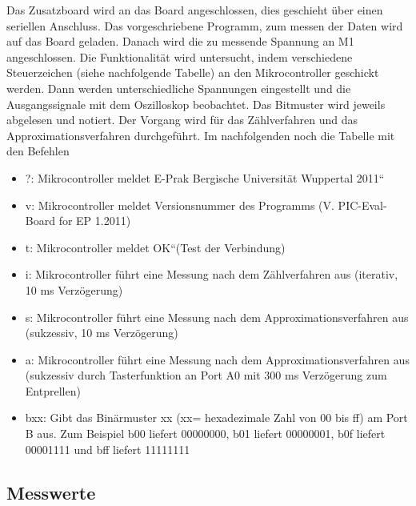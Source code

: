 \documentclass[12pt,a4paper]{article}
\begin{document}
Das Zusatzboard wird an das Board angeschlossen, dies geschieht über einen seriellen Anschluss. Das vorgeschriebene Programm, zum messen der Daten wird auf das Board geladen. Danach wird die zu messende Spannung an M1 angeschlossen. Die Funktionalität wird untersucht, indem verschiedene Steuerzeichen (siehe nachfolgende Tabelle) an den Mikrocontroller geschickt werden. Dann werden unterschiedliche Spannungen eingestellt und die Ausgangssignale mit dem Oszilloskop beobachtet. Das Bitmuster wird jeweils abgelesen und notiert. Der Vorgang wird für das Zählverfahren und das Approximationsverfahren durchgeführt. Im nachfolgenden noch die Tabelle mit den Befehlen

\begin{itemize}
\item	?: Mikrocontroller meldet E-Prak Bergische Universität Wuppertal 2011“

\item	v: Mikrocontroller meldet Versionsnummer des Programms (V. PIC-Eval-Board for EP 1.2011)

\item	t: Mikrocontroller meldet OK“(Test der Verbindung)

\item	i: Mikrocontroller führt eine Messung nach dem Zählverfahren aus (iterativ, 10 ms Verzögerung)

\item	s: Mikrocontroller führt eine Messung nach dem Approximationsverfahren aus (sukzessiv, 10 ms Verzögerung)

\item	a: Mikrocontroller führt eine Messung nach dem Approximationsverfahren aus (sukzessiv durch Tasterfunktion an Port A0 mit 300 ms Verzögerung zum Entprellen)

\item	bxx: Gibt das Binärmuster xx (xx= hexadezimale Zahl von 00 bis ff) am Port B aus. Zum Beispiel b00 liefert 00000000, b01 liefert 00000001, b0f liefert 00001111 und bff liefert 11111111

\end{itemize}

\subsection{Messwerte}
\end{document}
